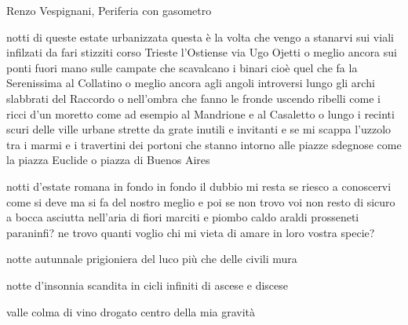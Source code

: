 \clearpage


\begin{artItem}
	Renzo Vespignani, Periferia con gasometro
\end{artItem}

\begin{poem}
	\begin{stanza}
		notti di queste estate urbanizzata\verseline
		questa è la volta che vengo a stanarvi\verseline
		sui viali infilzati da fari stizziti\verseline
		corso Trieste l'Ostiense via Ugo Ojetti\verseline
		o meglio ancora sui ponti fuori mano\verseline
		sulle campate che scavalcano i binari\verseline
		cioè quel che fa la Serenissima al Collatino\verseline
		o meglio ancora agli angoli introversi\verseline
		lungo gli archi slabbrati del Raccordo\verseline
		o nell'ombra che fanno le fronde\verseline
		uscendo ribelli come i ricci d'un moretto\verseline
		come ad esempio al Mandrione e al Casaletto\verseline
		o lungo i recinti scuri delle ville urbane\verseline
		strette da grate inutili e invitanti\verseline
		e se mi scappa l'uzzolo\verseline
		tra i marmi e i travertini dei portoni\verseline
		che stanno intorno alle piazze sdegnose\verseline
		come la piazza Euclide o piazza\verseline
		di Buenos Aires
	\end{stanza}

	\begin{stanza}
		notti d'estate romana\verseline
		in fondo in fondo il dubbio mi resta\verseline
		se riesco a conoscervi come si deve\verseline
		ma si fa del nostro meglio\verseline
		e poi se non trovo voi\verseline
		non resto di sicuro a bocca asciutta\verseline
		nell'aria di fiori marciti e piombo caldo\verseline
		araldi prosseneti paraninfi?\verseline
		ne trovo quanti voglio\verseline
		chi mi vieta di amare in loro vostra specie?
	\end{stanza}
\end{poem}

\clearpage


\begin{poem}
	\begin{stanza}
		notte autunnale\verseline
		prigioniera\verseline
		del luco più che\verseline
		delle civili mura
	\end{stanza}

	\begin{stanza}
		notte d'insonnia\verseline
		scandita in\verseline
		cicli infiniti\verseline
		di ascese e discese 
	\end{stanza}

	\begin{stanza}
		valle colma\verseline
		di vino drogato\verseline
		centro della mia\verseline
		gravità
	\end{stanza}
\end{poem}

